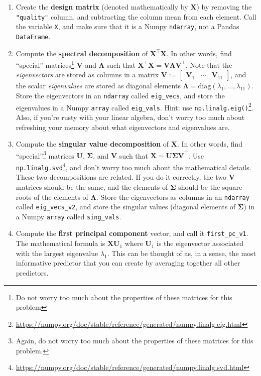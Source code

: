\documentclass[
  12pt,
]{krantz}
\renewcommand{\href}[2]{#2\footnote{\url{#1}}}
\begin{document}
\begin{enumerate}
\def\labelenumi{\alph{enumi}.}
\item
  Create the \textbf{design matrix} (denoted mathematically by \(\mathbf{X}\)) by removing the \texttt{"quality"} column, and subtracting the column mean from each element. Call the variable \texttt{X}, and make sure that it is a Numpy \texttt{ndarray}, not a Pandas \texttt{DataFrame}.
\item
  Compute the \textbf{spectral decomposition} of \(\mathbf{X}^\intercal \mathbf{X}\). In other words, find ``special'' matrices\footnote{Do not worry too much about the properties of these matrices for this problem} \(\mathbf{V}\) and \(\boldsymbol{\Lambda}\) such that \(\mathbf{X}^\intercal \mathbf{X} = \mathbf{V} \boldsymbol{\Lambda} \mathbf{V}^\intercal\). Note that the \emph{eigenvectors} are stored as columns in a matrix \(\mathbf{V} := \begin{bmatrix} \mathbf{V}_1 & \cdots & \mathbf{V}_{11}\end{bmatrix}\), and the scalar \emph{eigenvalues} are stored as diagonal elements \(\boldsymbol{\Lambda} = \text{diag}(\lambda_1, \ldots, \lambda_{11})\). Store the eigenvectors in an \texttt{ndarray} called \texttt{eig\_vecs}, and store the eigenvalues in a Numpy \texttt{array} called \texttt{eig\_vals}. Hint: use \href{https://numpy.org/doc/stable/reference/generated/numpy.linalg.eig.html}{\texttt{np.linalg.eig()}}. Also, if you're rusty with your linear algebra, don't worry too much about refreshing your memory about what eigenvectors and eigenvalues are.
\item
  Compute the \textbf{singular value decomposition} of \(\mathbf{X}\). In other words, find ``special''\footnote{Again, do not worry too much about the properties of these matrices for this problem.} matrices \(\mathbf{U}\), \(\mathbf{\Sigma}\), and \(\mathbf{V}\) such that \(\mathbf{X} = \mathbf{U} \mathbf{\Sigma} \mathbf{V}^\intercal\). Use \href{https://numpy.org/doc/stable/reference/generated/numpy.linalg.svd.html}{\texttt{np.linalg.svd}}, and don't worry too much about the mathematical details. These two decompositions are related. If you do it correctly, the two \(\mathbf{V}\) matrices should be the same, and the elements of \(\boldsymbol{\Sigma}\) should be the square roots of the elements of \(\boldsymbol{\Lambda}\). Store the eigenvectors as columns in an \texttt{ndarray} called \texttt{eig\_vecs\_v2}, and store the singular values (diagonal elements of \(\boldsymbol{\Sigma}\)) in a Numpy \texttt{array} called \texttt{sing\_vals}.
\item
  Compute the \textbf{first principal component} vector, and call it \texttt{first\_pc\_v1}. The mathematical formula is \(\mathbf{X} \mathbf{U}_1\) where \(\mathbf{U}_1\) is the eigenvector associated with the largest eigenvalue \(\lambda_1\). This can be thought of as, in a sense, the most informative predictor that you can create by averaging together all other predictors.
\end{enumerate}
\end{document}
